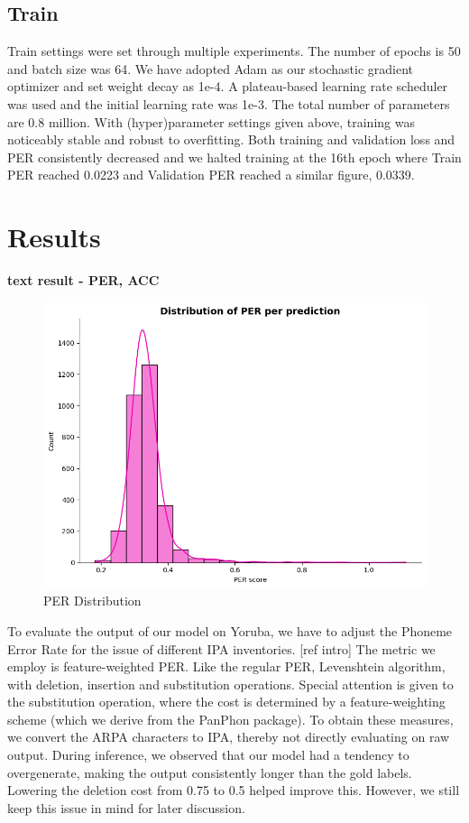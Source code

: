 \documentclass[11pt]{article}
\begin{document}
{\subsection{Train}
Train settings were set through multiple experiments. The number of epochs is 50 and batch size was 64. We have adopted Adam as our stochastic gradient optimizer and set weight decay as 1e-4. A plateau-based learning rate scheduler was used and the initial learning rate was 1e-3. The total number of parameters are 0.8 million. With (hyper)parameter settings given above, training was noticeably stable and robust to overfitting. Both training and validation loss and PER consistently decreased and we halted training at the 16th epoch where Train PER reached 0.0223 and Validation PER reached a similar figure, 0.0339.

\section{Results}

\textbf{text result - PER, ACC}
\begin{figure}
    \centering
    \includegraphics[width=0.75\linewidth]{model_per_distribution.png}
    \caption{PER Distribution}
    \label{fig:placeholder}
\end{figure}

To evaluate the output of our model on Yoruba, we have to adjust the Phoneme Error Rate for the issue of different IPA inventories. [ref intro] The metric we employ is feature-weighted PER. Like the regular PER, Levenshtein algorithm, with deletion, insertion and substitution operations. Special attention is given to the substitution operation, where the cost is determined by a feature-weighting scheme (which we derive from the PanPhon package). To obtain these measures, we convert the ARPA characters to IPA, thereby not directly evaluating on raw output. During inference, we observed that our model had a tendency to overgenerate, making the output consistently longer than the gold labels. Lowering the deletion cost from 0.75 to 0.5 helped improve this. However, we still keep this issue in mind for later discussion.

}
\end{document}
